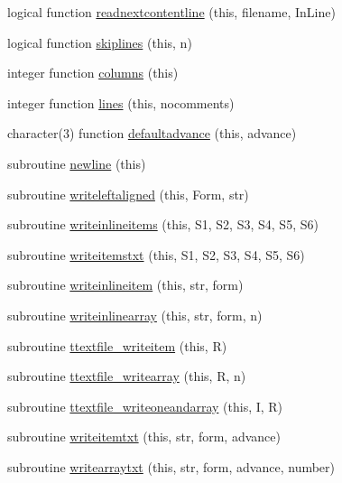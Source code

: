 \begin{DoxyCompactItemize}
\item 
logical function \mbox{\hyperlink{namespacefileutils_ada6e0a7d8b00d257b6902c5741d737bd}{readnextcontentline}} (this, filename, In\+Line)
\item 
logical function \mbox{\hyperlink{namespacefileutils_ae9b000065603bdcdab84740b77c43983}{skiplines}} (this, n)
\item 
integer function \mbox{\hyperlink{namespacefileutils_a91600ec19776dc37a388c71d74c6e0bf}{columns}} (this)
\item 
integer function \mbox{\hyperlink{namespacefileutils_a55dce72f20c256d70de9529936f7ebd8}{lines}} (this, nocomments)
\item 
character(3) function \mbox{\hyperlink{namespacefileutils_a8114041129cdfa75aa9d0c0195ff8da1}{defaultadvance}} (this, advance)
\item 
subroutine \mbox{\hyperlink{namespacefileutils_ae2a0937c572a3a07540ac002f8a620cd}{newline}} (this)
\item 
subroutine \mbox{\hyperlink{namespacefileutils_a4db10f3a8145e0e4d26416a1718a0c13}{writeleftaligned}} (this, Form, str)
\item 
subroutine \mbox{\hyperlink{namespacefileutils_acb35071046eb5e751ef36740cc5464f9}{writeinlineitems}} (this, S1, S2, S3, S4, S5, S6)
\item 
subroutine \mbox{\hyperlink{namespacefileutils_a081a95c89cd56409865919dc2230a9f3}{writeitemstxt}} (this, S1, S2, S3, S4, S5, S6)
\item 
subroutine \mbox{\hyperlink{namespacefileutils_af26bec360e1e147d731d1265d3b3e689}{writeinlineitem}} (this, str, form)
\item 
subroutine \mbox{\hyperlink{namespacefileutils_a421b7722f368ba1dbf80589c8f944804}{writeinlinearray}} (this, str, form, n)
\item 
subroutine \mbox{\hyperlink{namespacefileutils_a0b6a6b2a921c679e8226e4c2b11775d0}{ttextfile\+\_\+writeitem}} (this, R)
\item 
subroutine \mbox{\hyperlink{namespacefileutils_a8df98772000e2733576f361e197fa37a}{ttextfile\+\_\+writearray}} (this, R, n)
\item 
subroutine \mbox{\hyperlink{namespacefileutils_a8673cc2b2bcfe0639966d2789c1bbade}{ttextfile\+\_\+writeoneandarray}} (this, I, R)
\item 
subroutine \mbox{\hyperlink{namespacefileutils_ab3c52d3927403448ae70cbb4596db4af}{writeitemtxt}} (this, str, form, advance)
\item 
subroutine \mbox{\hyperlink{namespacefileutils_a94187e504a2d61ed06c891f18cab95e4}{writearraytxt}} (this, str, form, advance, number)

\end{DoxyCompactItemize}

